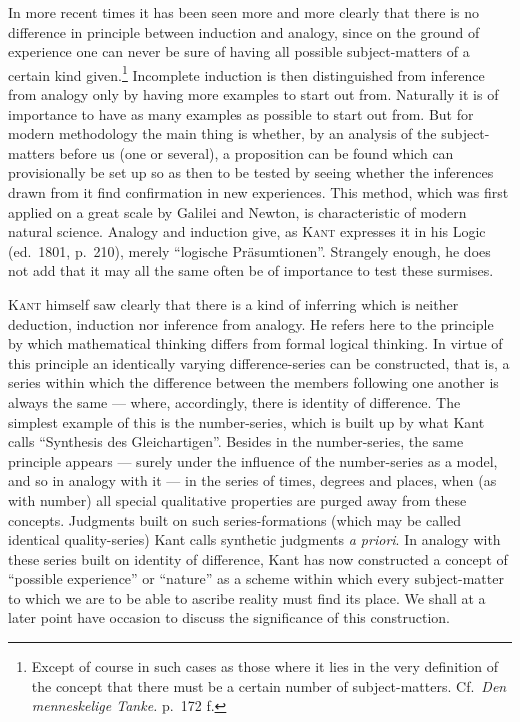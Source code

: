 \documentclass[12pt]{book}
\newcommand{\opage}[1]{\marginnote{\footnotesize\textit{[#1]}}}
\begin{document}
In more recent times it has been seen more and more clearly that there is no
difference in principle between induction and analogy, since on the ground of
experience one can never be sure of having all possible subject-matters of a
certain kind given.\footnote{Except of course in such cases as those where it
lies in the very definition of the concept that there must be a certain number
of subject-matters. Cf.\ \textit{Den menneskelige Tanke.} p.\ 172 f.} Incomplete
induction is then distinguished from inference from analogy only by having more
examples to start out from. Naturally it is of importance to have as many
examples as possible to start out from. But for modern \opage{54}methodology the main
thing is whether, by an analysis of the subject-matters before us (one or
several), a proposition can be found which can provisionally be set up so as
then to be tested by seeing whether the inferences drawn from it find
confirmation in new experiences. This method, which was first applied on a great
scale by Galilei and Newton, is characteristic of modern natural science.
Analogy and induction give, as \textsc{Kant} expresses it in his Logic (ed.\
1801, p.\ 210), merely ``logische Präsumtionen''. Strangely enough, he does not
add that it may all the same often be of importance to test these surmises.

\textsc{Kant} himself saw clearly that there is a kind of inferring which is
neither deduction, induction nor inference from analogy. He refers here to the
principle by which mathematical thinking differs from formal logical thinking.
In virtue of this principle an identically varying difference-series can be
constructed, that is, a series within which the difference between the members
following one another is always the same --- where, accordingly, there is
identity of difference. The simplest example of this is the number-series, which
is built up by what Kant calls ``Synthesis des Gleichartigen''. Besides in the
number-series, the same principle appears --- surely under the influence of the
number-series as a model, and so in analogy with it --- in the series of times,
degrees and places, when (as with number) all special qualitative properties are
purged away from these concepts. Judgments built on such series-formations
(which may be called identical quality-series) Kant calls synthetic judgments
\textit{a priori}. In analogy with these series built on identity of difference,
Kant has now constructed a concept of ``possible experience'' or ``nature'' as a
scheme within which every subject-matter to which we are to be able to ascribe
reality must find its place. \opage{55}We shall at a later point have occasion to discuss
the significance of this construction.
\end{document}
